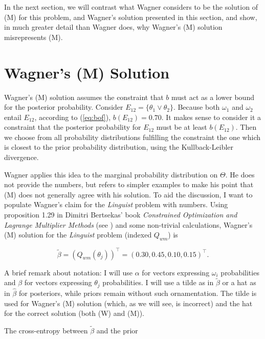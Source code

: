 In the next section, we will contrast what Wagner considers to be the
solution of (M) for this problem,  and
Wagner's solution presented in this section,  and show, in much greater detail than Wagner does, why
Wagner's (M) solution misrepresents (M).

\section{Wagner's (M) Solution}
\label{WagnersMSolution}

Wagner's (M) solution assumes the constraint that $b$ must act as a
lower bound for the posterior probability. Consider
$E_{12}=\{\theta_{1}\vee\theta_{2}\}$. Because both $\omega_{1}$ and
$\omega_{2}$ entail $E_{12}$, according to (\ref{eq:bof}),
$b(E_{12})=0.70$. It makes sense to consider it a constraint that the
posterior probability for $E_{12}$ must be at least $b(E_{12})$. Then
we choose from all probability distributions fulfilling the constraint
the one which is closest to the prior probability distribution, using
the Kullback-Leibler divergence.

Wagner applies this idea to the marginal probability distribution on
$\Theta$. He does not provide the numbers, but refers to simpler
examples to make his point that (M) does not generally agree with his
solution. To aid the discussion, I want to populate Wagner's claim for
the \emph{Linguist} problem with numbers. Using proposition 1.29 in
Dimitri Bertsekas' book \emph{Constrained Optimization and Lagrange
  Multiplier Methods} (see ) and some
non-trivial calculations, Wagner's (M) solution for the
\emph{Linguist} problem (indexed $Q_{wm}$) is

\begin{equation}
  \label{eq:p13}
  \tilde{\beta}=(Q_{wm}(\theta_{j}))^{\intercal}=(0.30,0.45,0.10,0.15)^{\intercal}.
\end{equation}

A brief remark about notation: I will use $\alpha$ for vectors
expressing $\omega_{i}$ probabilities and $\beta$ for vectors
expressing $\theta_{j}$ probabilities. I will use a tilde as in
$\tilde{\beta}$ or a hat as in $\hat{\beta}$ for posteriors, while
priors remain without such ornamentation. The tilde is used for
Wagner's (M) solution (which, as we will see, is incorrect) and the
hat for the correct solution (both (W) and (M)).

The cross-entropy between $\tilde{\beta}$ and the prior


